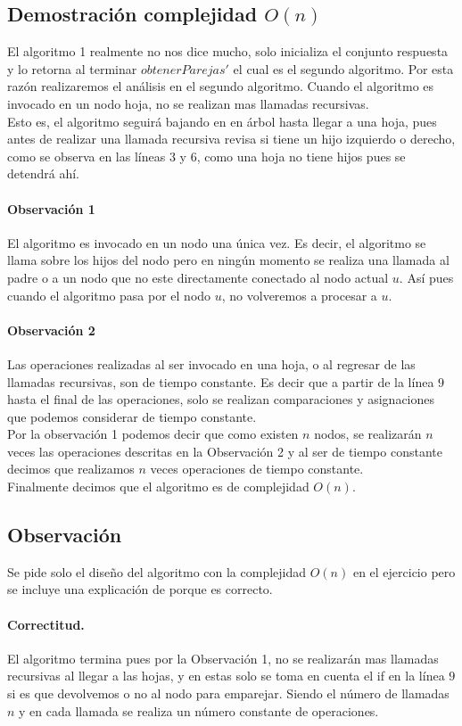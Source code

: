 \documentclass[12pt]{article}
\begin{document}
\subsection{Demostración complejidad $O(n)$}
El algoritmo 1 realmente no nos dice mucho, solo inicializa el conjunto respuesta y lo retorna al terminar $obtenerParejas'$ el cual es el segundo algoritmo. Por esta razón realizaremos el análisis en el segundo algoritmo.
Cuando el algoritmo es invocado en un nodo hoja, no se realizan mas llamadas recursivas.\\
Esto es, el algoritmo seguirá bajando en en árbol hasta llegar a una hoja, pues antes de realizar una llamada recursiva revisa si tiene un hijo izquierdo o derecho, como se observa en las líneas $3$ y $6$, como una hoja no tiene hijos pues se detendrá ahí.\\
\paragraph{Observación 1} El algoritmo es invocado en un nodo una única vez. Es decir, el algoritmo se llama sobre los hijos del nodo pero en ningún momento se realiza una llamada al padre o a un nodo que no este directamente conectado al nodo actual $u$. Así pues cuando el algoritmo pasa por el nodo $u$, no volveremos a procesar a $u$.\\
\paragraph{Observación 2} Las operaciones realizadas al ser invocado en una hoja, o al regresar de las llamadas recursivas, son de tiempo constante. Es decir que a partir de la línea $9$ hasta el final de las operaciones, solo se realizan comparaciones y asignaciones que podemos considerar de tiempo constante.   \\
Por la observación 1 podemos decir que como existen $n$ nodos, se realizarán $n$ veces las operaciones descritas en la Observación 2 y al ser de tiempo constante decimos que realizamos $n$ veces operaciones de tiempo constante. \\
Finalmente decimos que el algoritmo es de complejidad $O(n)$.
\subsection{Observación} Se pide solo el diseño del algoritmo con la complejidad $O(n)$ en el ejercicio pero se incluye una explicación de porque es correcto.
\paragraph{Correctitud.} 
El algoritmo termina pues por la Observación 1, no se realizarán mas llamadas recursivas al llegar a las hojas, y  en estas solo se toma en cuenta el if en la línea $9$ si es que devolvemos o no al nodo para emparejar. Siendo el número de llamadas $n$ y en cada llamada se realiza un número constante de operaciones.\\
\end{document}
